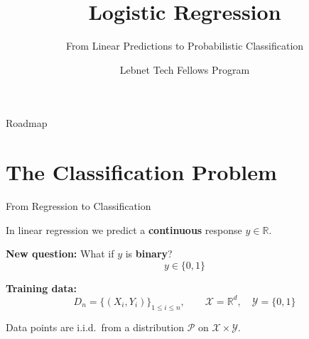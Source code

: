 \documentclass[aspectratio=169, professionalfonts]{beamer}
\title{Logistic Regression}
\subtitle{From Linear Predictions to Probabilistic Classification}
\author{Lebnet Tech Fellows Program}
\date{}
\def\R{\mathbb{R}}
\begin{document}
\begin{frame}
\titlepage
\end{frame}

\begin{frame}{Roadmap}
\tableofcontents
\end{frame}

\section{The Classification Problem}

\begin{frame}{From Regression to Classification}

In linear regression we predict a \textbf{continuous} response $y \in \R$.

\bigskip

\textbf{New question:} What if $y$ is \textbf{binary}?
$$y \in \{0, 1\}$$

\bigskip

\textbf{Training data:}
$$D_n = \{(X_i, Y_i)\}_{1 \le i \le n}, \qquad
  \mathcal{X} = \R^d,\quad \mathcal{Y} = \{0,1\}$$

Data points are i.i.d.\ from a distribution $\mathcal{P}$ on $\mathcal{X}\times\mathcal{Y}$.

\end{frame}
\end{document}
